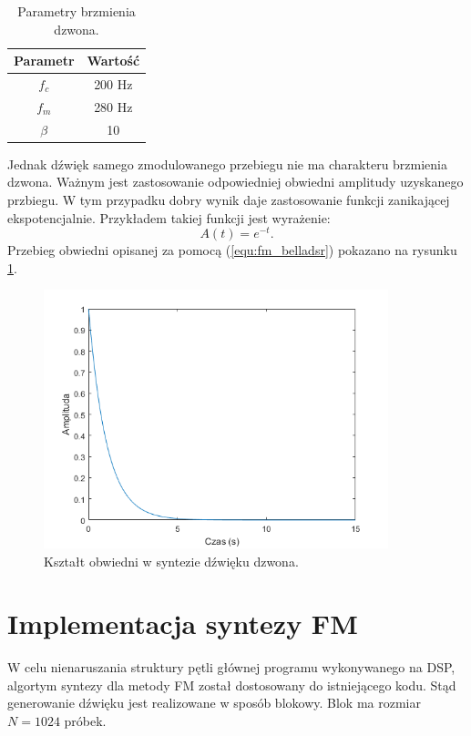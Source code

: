 \begin{table}[h!]
\centering
	\begin{tabular}{ |c| c| }
	\hline
	Parametr & Wartość \\
	\hline
	$f_c$ & 200 Hz \\
	\hline
	$f_m$ & 280 Hz\\
	\hline
	$\beta$ & 10\\
	\hline
	
	\end{tabular}
\captionsetup{justification=centering}
\label{tab:fm_bell}
\caption{Parametry brzmienia dzwona.}
\end{table}
Jednak dźwięk samego zmodulowanego przebiegu nie ma charakteru brzmienia dzwona. Ważnym jest zastosowanie odpowiedniej obwiedni amplitudy uzyskanego przbiegu. W tym przypadku dobry wynik daje zastosowanie funkcji zanikającej ekspotencjalnie. Przykładem takiej funkcji jest wyrażenie:
\begin{equation} \label{equ:fm_belladsr}
A(t) = e^{-t}.
\end{equation}
Przebieg obwiedni opisanej za pomocą (\ref{equ:fm_belladsr}) pokazano na rysunku \ref{rys:fm_belladsr}.
\begin{figure}[H]
	\centering
	\includegraphics[width=10cm]{grafiki/fm_belladsr}
	\captionsetup{justification=centering}
	\caption{Kształt obwiedni w syntezie dźwięku dzwona.}
	\label{rys:fm_belladsr}
\end{figure}

\section{Implementacja syntezy FM}
W celu nienaruszania struktury pętli głównej programu wykonywanego na DSP, algortym syntezy dla metody FM został dostosowany do istniejącego kodu. Stąd generowanie dźwięku jest realizowane w sposób blokowy. Blok ma rozmiar $N = 1024$ próbek. 
